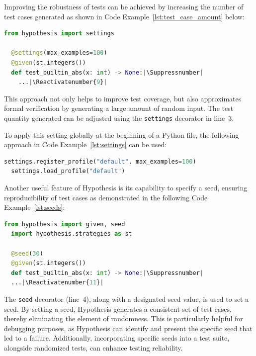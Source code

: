 \documentclass[runningheads]{llncs}
\makeatletter
\let\origthelstnumber\thelstnumber
\newcommand*\Suppressnumber{%
  \lst@AddToHook{OnNewLine}{%
    \let\thelstnumber\relax%
     \advance\c@lstnumber-\@ne\relax%
    }%
}
\newcommand*\Reactivatenumber[1]{%
  \setcounter{lstnumber}{\numexpr#1-1\relax}
  \lst@AddToHook{OnNewLine}{%
   \let\thelstnumber\origthelstnumber%
   \refstepcounter{lstnumber}%
  }%
}
\makeatother
\begin{document}
\vspace{5mm}
\noindent Improving the robustness of tests can be achieved by increasing the number of test cases generated as shown in Code Example~\ref{lst:test_case_amount} below:

\begin{lstlisting}[language=Python,caption={Specifying Test Case Amount from \texttt{tutorial.ipynb}},label=lst:test_case_amount]
  from hypothesis import settings

  @settings(max_examples=100)
  @given(st.integers())
  def test_builtin_abs(x: int) -> None:|\Suppressnumber|
    ...|\Reactivatenumber{9}|

\end{lstlisting}
This approach not only helps to improve test coverage, but also approximates formal verification by generating a large amount of random input. The test quantity generated can be adjusted using the \texttt{settings} decorator in line~3.

To apply this setting globally at the beginning of a Python file, the following approach in Code Example~\ref{lst:settings} can be used:

\begin{lstlisting}[language=Python,caption={Global Settings from \texttt{tutorial.ipynb}},label=lst:settings]
  settings.register_profile("default", max_examples=100)
  settings.load_profile("default")
\end{lstlisting}

\vspace{5mm}
\noindent Another useful feature of Hypothesis is its capability to specify a seed, ensuring reproducibility of test cases as demonstrated in the following Code Example~\ref{lst:seeds}:

\begin{lstlisting}[language=Python,caption={Specifying Seeds from \texttt{tutorial.ipynb}},label=lst:seeds]
  from hypothesis import given, seed
  import hypothesis.strategies as st

  @seed(30)
  @given(st.integers())
  def test_builtin_abs(x: int) -> None:|\Suppressnumber|
  ...|\Reactivatenumber{11}|

\end{lstlisting}
The \texttt{seed} decorator (line~4), along with a designated seed value, is used to set a seed. By setting a seed, Hypothesis generates a consistent set of test cases, thereby eliminating the element of randomness. This is particularly helpful for debugging purposes, as Hypothesis can identify and present the specific seed that led to a failure. Additionally, incorporating specific seeds into a test suite, alongside randomized tests, can enhance testing reliability.
\end{document}
